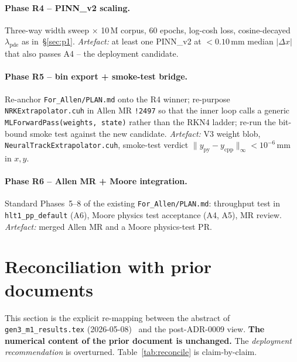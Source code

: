\documentclass[11pt,a4paper]{article}
\begin{document}
\paragraph{Phase R4 -- PINN\_v2 scaling.} Three-way width sweep
$\times$ 10\,M corpus, 60 epochs, log-cosh loss, cosine-decayed
$\lambda_{\mathrm{pde}}$ as in~\S\ref{sec:p1}. \emph{Artefact:} at
least one PINN\_v2 at $<0.10$\,mm median $|\Delta x|$ that also
passes A4 -- the deployment candidate.

\paragraph{Phase R5 -- bin export + smoke-test bridge.} Re-anchor
\texttt{For\_Allen/PLAN.md} onto the R4 winner; re-purpose
\texttt{NRKExtrapolator.cuh} in Allen MR \texttt{!2497} so that the
inner loop calls a generic \texttt{MLForwardPass(weights, state)}
rather than the RKN4 ladder; re-run the bit-bound smoke test
against the new candidate. \emph{Artefact:} V3 weight blob,
\texttt{NeuralTrackExtrapolator.cuh}, smoke-test verdict
$\|y_{\text{py}}-y_{\text{cpp}}\|_\infty < 10^{-6}$\,mm in $x,y$.

\paragraph{Phase R6 -- Allen MR + Moore integration.} Standard
Phases~5--8 of the existing \texttt{For\_Allen/PLAN.md}: throughput
test in \texttt{hlt1\_pp\_default} (A6), Moore physics test
acceptance (A4, A5), MR review. \emph{Artefact:} merged Allen MR
and a Moore physics-test PR.

\section{Reconciliation with prior documents}\label{sec:reconciliation}

This section is the explicit re-mapping between the abstract of
\texttt{gen3\_m1\_results.tex} (2026-05-08)~\cite{gen3m1} and the
post-ADR-0009 view. \textbf{The numerical content of the prior
document is unchanged.} The \emph{deployment recommendation} is
overturned. Table~\ref{tab:reconcile} is claim-by-claim.
\end{document}

